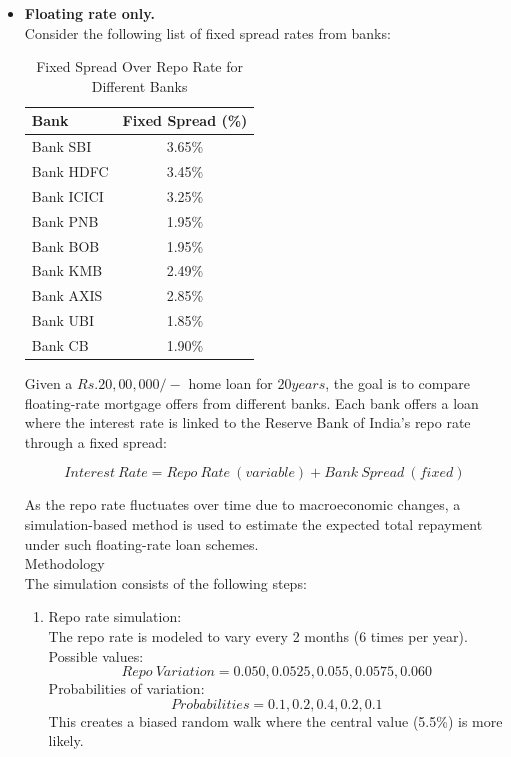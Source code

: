 \begin{itemize}
\textbf{Conclusion}: \textit{The bank with the lowest total repayment is Bank UBI, offering a fixed interest rate of 7.35\%. Therefore, based on this comparison, Bank UBI is the most cost-effective choice for a 20-year fixed-rate home loan of Rs.20 lakhs.}


\item 
\textbf{Floating rate only.}\\

Consider the following list of fixed spread rates from banks:

\begin{table}[h]
    \centering
    \begin{tabular}{lc}
        \toprule
        \textbf{Bank} & \textbf{Fixed Spread (\%)} \\
        \midrule
        Bank SBI   & 3.65\% \\
        Bank HDFC  & 3.45\% \\
        Bank ICICI & 3.25\% \\
        Bank PNB   & 1.95\% \\
        Bank BOB   & 1.95\% \\
        Bank KMB   & 2.49\% \\
        Bank AXIS  & 2.85\% \\
        Bank UBI   & 1.85\% \\
        Bank CB    & 1.90\% \\
        \bottomrule
    \end{tabular}
    \caption{Fixed Spread Over Repo Rate for Different Banks}
    \label{tab:fixed-spread-only}
\end{table}


Given a $Rs.20,00,000/-$ home loan for $20 years$, the goal is to compare floating-rate mortgage offers from different banks. Each bank offers a loan where the interest rate is linked to the Reserve Bank of India's repo rate through a fixed spread:

\[
Interest\ Rate=Repo\ Rate\ (variable)+Bank\ Spread\ (fixed)
\]

As the repo rate fluctuates over time due to macroeconomic changes, a simulation-based method is used to estimate the expected total repayment under such floating-rate loan schemes.\\

Methodology\\
The simulation consists of the following steps:
\begin{enumerate}
    \item Repo rate simulation:\\
    The repo rate is modeled to vary every 2 months (6 times per year). Possible values:\\
    \[
    Repo\ Variation = {0.050, 0.0525, 0.055,0.0575, 0.060}
    \]
    Probabilities of variation:
    \[
    Probabilities = {0.1,0.2,0.4,0.2,0.1}
    \]
    This creates a biased random walk where the central value (5.5\%) is more likely.


\end{enumerate}
\end{itemize}
